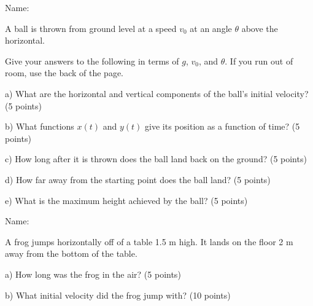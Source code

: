 \documentclass[12pt]{article}
\begin{document}
\newpage

\begin{flushright}
Name: \underline{\hspace{3in}}
        \end{flushright}

        \Large \centerline{}
        \normalsize
        \rm

A ball is thrown from ground level at a speed $v_0$ at an angle $\theta$ above the horizontal.

\bigskip

Give your answers to the following in terms of $g$, $v_0$, and $\theta$. If you run out of room, use the back of the page.

\it \bigskip

a) What are the horizontal and vertical components of the ball's initial velocity? (5 points)

\vspace{1in}

b) What functions $x(t)$ and $y(t)$ give its position as a function of time? (5 points)

\vspace{1in}

c) How long after it is thrown does the ball land back on the ground? (5 points)

\vspace{1in}

d) How far away from the starting point does the ball land? (5 points)

\vspace{1in}

e) What is the maximum height achieved by the ball? (5 points)

\newpage


\begin{flushright}
Name: \underline{\hspace{3in}}
        \end{flushright}

        \Large \centerline{}
        \normalsize
        \rm

A frog jumps horizontally off of a table 1.5 m high. It lands on the floor 2 m away from the bottom of the table.

\it \bigskip

a) How long was the frog in the air? (5 points)

\vspace{1.2in}

b) What initial velocity did the frog jump with? (10 points)
\end{document}
